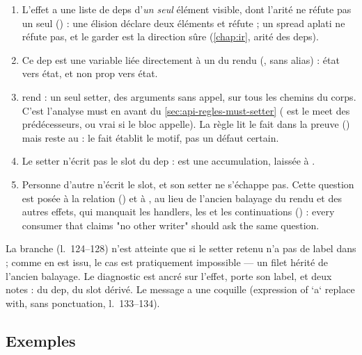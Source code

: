 \begin{enumerate}
  \item L'effet a une liste de deps d'\emph{un seul} élément visible, dont l'arité ne réfute pas \og un seul\fg{} () : une élision \code{[a, ,]} déclare deux éléments et réfute ; un spread aplati ne réfute pas, et le garder est la direction sûre (\cref{chap:ir}, arité des deps).
  \item Ce dep est une variable liée directement à un  du rendu (, sans alias) : état vers état, et non prop vers état.
  \item {} rend  : un seul setter, des arguments sans appel, sur tous les chemins du corps. C'est l'analyse must en avant du \cref{sec:api-regles-must-setter} ( est le meet des prédécesseurs, ou vrai si le bloc appelle). La règle lit le fait dans la preuve () mais reste au \Warning : le fait établit le motif, pas un défaut certain.
  \item Le setter n'écrit pas le slot du dep :  est une accumulation, laissée à .
  \item Personne d'autre n'écrit le slot, et son setter ne s'échappe pas. Cette question est posée à la relation  () et à , au lieu de l'ancien balayage du rendu et des autres effets, qui manquait les handlers, les  et les continuations () : \og every consumer that claims "no other writer" should ask the same question\fg.
\end{enumerate}

La branche  (l.~124--128) n'est atteinte que si le setter retenu n'a pas de label dans  ; comme  en est issu, le cas est pratiquement impossible --- un filet hérité de l'ancien balayage. Le diagnostic est ancré sur l'effet, porte son label, et deux notes :  du dep,  du slot dérivé. Le message a une coquille (\og expression of `a` replace with\fg, sans ponctuation, l.~133--134).

\subsection{Exemples}

